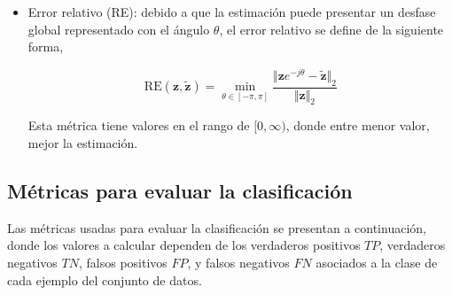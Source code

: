 \begin{itemize}
    \item Error relativo (RE): debido a que la estimación puede presentar un desfase global representado con el ángulo $\theta$, el error relativo se define de la siguiente forma,
    
    \begin{equation}
        \mathrm{RE}(\mathbf{z}, \tilde{\mathbf{z}}) = \min_{\theta \in [-\pi, \pi]}\frac{  \Vert \mathbf{z}e^{-j\theta} - \tilde{\mathbf{z}}\Vert_2}{\Vert \mathbf{z} \Vert_2}
        \label{eq:RE}
    \end{equation}
    
    Esta métrica tiene valores en el rango de $[0, \infty)$, donde entre menor valor, mejor la estimación.
\end{itemize}
\subsection{Métricas para evaluar la clasificación}
Las métricas usadas para evaluar la clasificación se presentan a continuación, donde los valores a calcular dependen de los verdaderos positivos $TP$, verdaderos negativos $TN$, falsos positivos $FP$, y falsos negativos $FN$ asociados a la clase de cada ejemplo del conjunto de datos.


